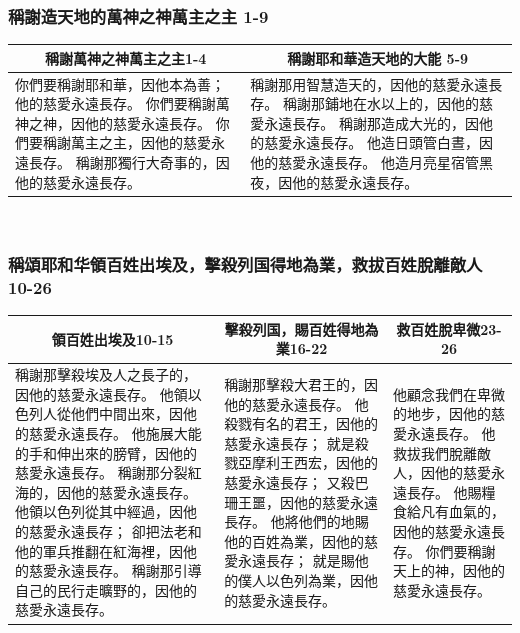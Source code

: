 \subsubsection{稱謝造天地的萬神之神萬主之主 1-9}
\begin{table}[H]
\centering
\begin{tabular}{p{}|p{8.750cm}}\hline\hline
\multicolumn{1}{c|}{稱謝萬神之神萬主之主1-4}&\multicolumn{1}{c}{稱謝耶和華造天地的大能 5-9}\\\hline
你們要稱謝耶和華，因他本為善；他的慈愛永遠長存。
你們要稱謝萬神之神，因他的慈愛永遠長存。
你們要稱謝萬主之主，因他的慈愛永遠長存。
稱謝那獨行大奇事的，因他的慈愛永遠長存。
&稱謝那用智慧造天的，因他的慈愛永遠長存。
稱謝那鋪地在水以上的，因他的慈愛永遠長存。
稱謝那造成大光的，因他的慈愛永遠長存。
他造日頭管白晝，因他的慈愛永遠長存。
他造月亮星宿管黑夜，因他的慈愛永遠長存。\\\hline
\end{tabular}
\end{table} 

\subsubsection{稱頌耶和华領百姓出埃及，擊殺列国得地為業，救拔百姓脫離敵人 10-26}
\begin{table}[H]
\centering
\begin{tabular}{p{7.05cm}|p{5.70cm}|p{3.90cm}}\hline\hline
\multicolumn{1}{c|}{領百姓出埃及10-15}&\multicolumn{1}{c|}{擊殺列国，賜百姓得地為業16-22}&\multicolumn{1}{c}{救百姓脫卑微23-26}\\\hline
稱謝那擊殺埃及人之長子的，因他的慈愛永遠長存。
他領以色列人從他們中間出來，因他的慈愛永遠長存。
他施展大能的手和伸出來的膀臂，因他的慈愛永遠長存。
稱謝那分裂紅海的，因他的慈愛永遠長存。
他領以色列從其中經過，因他的慈愛永遠長存；
卻把法老和他的軍兵推翻在紅海裡，因他的慈愛永遠長存。
稱謝那引導自己的民行走曠野的，因他的慈愛永遠長存。
&稱謝那擊殺大君王的，因他的慈愛永遠長存。
他殺戮有名的君王，因他的慈愛永遠長存；
就是殺戮亞摩利王西宏，因他的慈愛永遠長存；
又殺巴珊王噩，因他的慈愛永遠長存。
他將他們的地賜他的百姓為業，因他的慈愛永遠長存；
就是賜他的僕人以色列為業，因他的慈愛永遠長存。
&他顧念我們在卑微的地步，因他的慈愛永遠長存。
他救拔我們脫離敵人，因他的慈愛永遠長存。
他賜糧食給凡有血氣的，因他的慈愛永遠長存。
你們要稱謝天上的神，因他的慈愛永遠長存。\\\hline
\end{tabular}
\end{table} 


